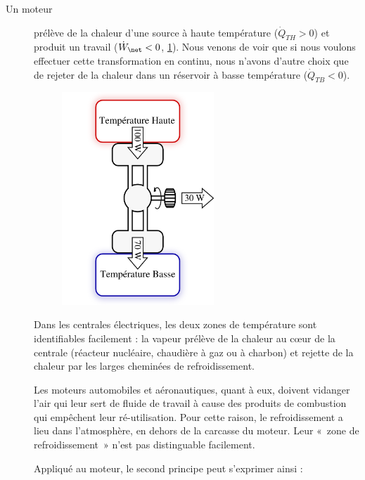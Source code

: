 		\begin{description}

			\item[Un moteur]{prélève de la chaleur d’une source à haute température ($\dot Q_{TH} > 0$) et produit un travail ($\dot W_\net < 0$, \cref{fig_moteur_exemple_valeurs}). Nous venons de voir que si nous voulons effectuer cette transformation en continu, nous n’avons d’autre choix que de rejeter de la chaleur dans un réservoir à basse température ($\dot Q_{TB} < 0$).

			\begin{figure}
				\begin{center}
					\includegraphics[height=8cm]{images/exemple_moteur.png}
				\end{center}
				\label{fig_moteur_exemple_valeurs}
			\end{figure}

			Dans les centrales électriques, les deux zones de température sont identifiables facilement : la vapeur prélève de la chaleur au cœur de la centrale (réacteur nucléaire, chaudière à gaz ou à charbon) et rejette de la chaleur par les larges cheminées de refroidissement.

			Les moteurs automobiles et aéronautiques, quant à eux, doivent vidanger l’air qui leur sert de fluide de travail à cause des produits de combustion qui empêchent leur ré-utilisation. Pour cette raison, le refroidissement a lieu dans l’atmosphère, en dehors de la carcasse du moteur. Leur «~zone de refroidissement~» n’est pas distinguable facilement.

			Appliqué au moteur, le second principe peut s’exprimer ainsi :

}
\end{description}
